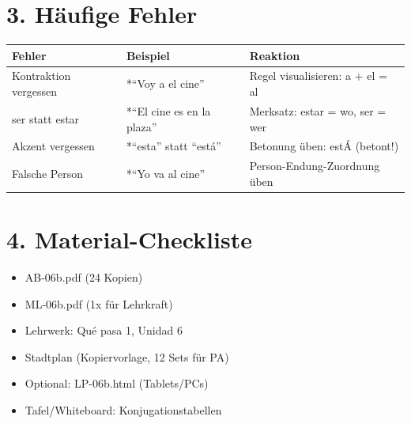 \documentclass[11pt, a4paper]{article}
\begin{document}
\section*{3. Häufige Fehler}

\begin{fehlerbox}
\begin{tabularx}{\textwidth}{|l|X|X|}
\hline
\textbf{Fehler} & \textbf{Beispiel} & \textbf{Reaktion} \\
\hline
Kontraktion vergessen & *``Voy a el cine'' & Regel visualisieren: a + el = al \\
\hline
ser statt estar & *``El cine es en la plaza'' & Merksatz: estar = wo, ser = wer \\
\hline
Akzent vergessen & *``esta'' statt ``está'' & Betonung üben: estÁ (betont!) \\
\hline
Falsche Person & *``Yo va al cine'' & Person-Endung-Zuordnung üben \\
\hline
\end{tabularx}
\end{fehlerbox}


\section*{4. Material-Checkliste}

\begin{materialbox}
\begin{itemize}[label=$\square$]
    \item AB-06b.pdf (24 Kopien)
    \item ML-06b.pdf (1x für Lehrkraft)
    \item Lehrwerk: Qué pasa 1, Unidad 6
    \item Stadtplan (Kopiervorlage, 12 Sets für PA)
    \item Optional: LP-06b.html (Tablets/PCs)
    \item Tafel/Whiteboard: Konjugationstabellen
\end{itemize}
\end{materialbox}

\end{document}
